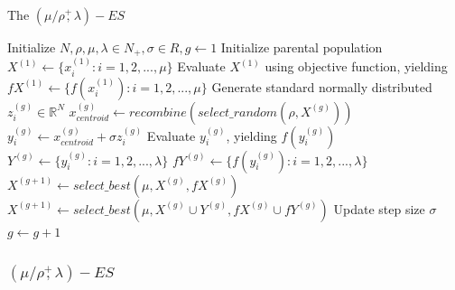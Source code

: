 \begin{algorithm}
\caption{The $(\mu/\rho\overset{+}{,}\lambda)-ES$}
\label{alg:general_es}
\begin{algorithmic}[1]
\STATE Initialize $N,\rho,\mu,\lambda \in N_+,\sigma \in R, g \leftarrow 1$
\STATE Initialize parental population $X^{(1)} \leftarrow \{x_i^{(1)}: i=1,2,...,\mu\}$
\STATE Evaluate $X^{(1)}$ using objective function, yielding $fX^{(1)} \leftarrow \{ f(x_i^{(1)}): i=1,2,...,\mu \}$
		\STATE Generate standard normally distributed $z_i^{(g)} \in \mathbb{R}^N $
		\STATE $x_{centroid}^{(g)} \leftarrow  recombine (select\_random (\rho,X^{(g)}))$ 
		\STATE $y_i^{(g)} \leftarrow x_{centroid}^{(g)} + \sigma z_i^{(g)}$
		\STATE Evaluate $y_i^{(g)}$, yielding $f(y_i^{(g)})$
	\ENDFOR
	\STATE $Y^{(g)} \leftarrow \{y_i^{(g)}: i=1,2,...,\lambda\}$
	\STATE $fY^{(g)} \leftarrow \{f(y_i^{(g)}): i=1,2,...,\lambda\}$
		\STATE $X^{(g+1)} \leftarrow  select\_best (\mu,X^{(g)},fX^{(g)})$
		\STATE $X^{(g+1)} \leftarrow  select\_best (\mu,X^{(g)} \cup Y^{(g)},fX^{(g)} \cup fY^{(g)})$
	\ENDIF
	\STATE Update step size $\sigma$
	\STATE $g\leftarrow g+1$
\ENDWHILE

\end{algorithmic}
\end{algorithm}

\subsubsection{$(\mu/\rho\overset{+}{,}\lambda)-ES$ \cite{hansen2015evolution}}\label{sssec:def_ES}\hfill

